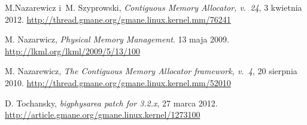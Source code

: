 \begin{thebibliography}{9}


  M.Nazarewicz i~M. Szyprowski,
  \emph{Contiguous Memory Allocator, v.\ 24},
  3 kwietnia 2012.
  \url{http://thread.gmane.org/gmane.linux.kernel.mm/76241}

  M. Nazarwicz,
  \emph{Physical Memory Management}.
  13 maja 2009.
  \url{http://lkml.org/lkml/2009/5/13/100}

  M. Nazarewicz,
  \emph{The Contiguous Memory Allocator framework, v.\ 4},
  20 sierpnia 2010.
  \url{http://thread.gmane.org/gmane.linux.kernel.mm/52010}

  D. Tochansky,
  \emph{bigphysarea patch for 3.2.x},
  27 marca 2012.
  \url{http://article.gmane.org/gmane.linux.kernel/1273100}


\end{thebibliography}
